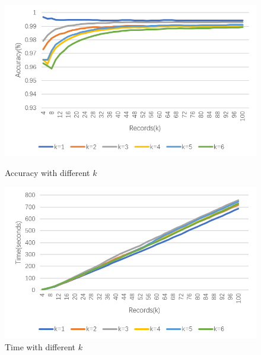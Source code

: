 \documentclass[runningheads]{llncs}
\begin{document}
	\begin{figure}
		\centering
		\begin{minipage}[t]{0.46\textwidth}
			\centering
			\includegraphics[width=1.0\textwidth]{figure-k-accuracy}
			\caption{Accuracy with different $k$}
			\label{fig:accuracy:k}
		\end{minipage}
		\hspace{3mm}
		\begin{minipage}[t]{0.46\textwidth}
			\centering
			\includegraphics[width=1.0\textwidth]{figure-k-time}
			\caption{Time with different $k$}
			\label{fig:time:k}
		\end{minipage}%
	\end{figure}
\end{document}

